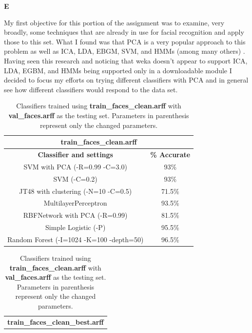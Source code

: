 \documentclass{report}
\begin{document}
\begin{center}{\bf E}\end{center}
My first objective for this portion of the assignment was to examine,
very broadly, some techniques that are already in use for facial
recognition and apply those to this set. What I found was that PCA is
a very popular approach to this problem as well as ICA, LDA, EBGM,
SVM, and HMMs (among many others) \cite{PCA0,PCA1,ICA0,LDA0,EBGM,SVM,HMM}. 
Having seen this research and noticing that weka doesn't appear to
support ICA, LDA, EGBM, and HMMs being supported only in a
downloadable module I decided to focus my efforts on trying
different classifiers with PCA and in general see how different
classifiers would respond to the data set.
\begin{table}[h]
  \begin{minipage}[b]{0.5\linewidth}
    \centering
    \begin{tabular}{|c|c|}
      \hline
      \multicolumn{2}{|c|}{{\bf train\_faces\_clean.arff}}\\
      \hline
          {\bf Classifier and settings} & {\bf \% Accurate}\\
          \hline
          SVM with PCA (-R=0.99 -C=3.0) & 93\%\\
          \hline
          SVM (-C=0.2) & 93\%\\
          \hline
          JT48 with clustering (-N=10 -C=0.5) & 71.5\%\\
          \hline
          MultilayerPerceptron & 93.5\%\\
          \hline
          RBFNetwork with PCA (-R=0.99) & 81.5\%\\
          \hline
          Simple Logistic (-P) & 95.5\%\\
          \hline
          Random Forest (-I=1024 -K=100 -depth=50) & 96.5\%\\
          \hline
    \end{tabular}
    \caption{Classifiers trained using {\bf train\_faces\_clean.arff}
      with {\bf val\_faces.arff} as the testing set. Parameters in
      parenthesis represent only the changed parameters.}
    \label{Table 1}
  \end{minipage}
  \hspace{0.6cm}
  \begin{minipage}[b]{0.5\linewidth}
    \centering
    \begin{tabular}{|c|c|}
      \hline
      \multicolumn{2}{|c|}{{\bf train\_faces\_clean\_best.arff}}\\

\end{tabular}
\end{minipage}
\end{table}
\end{document}
